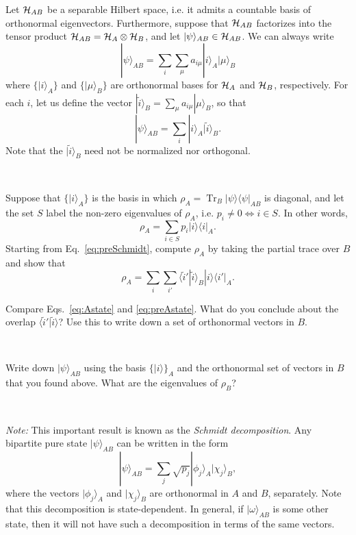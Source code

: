 \documentclass[a4paper,11pt]{article}
\DeclareMathOperator{\Tr}{Tr}
\newcommand{\ket}[1]{|#1\rangle}
\newcommand{\braket}[2]{\langle #1|#2\rangle}
\newcommand{\ketbra}[2]{| #1 \rangle \langle #2 |}
\newcommand{\Hil}{{\cal H}}
\begin{document}
\noindent Let $\Hil_{AB}$ be a separable Hilbert space, i.e. it admits a countable basis of orthonormal eigenvectors.
Furthermore, suppose that $\Hil_{AB}$ factorizes into the tensor product $\Hil_{AB} = \Hil_A \otimes \Hil_B$, and let $\ket{\psi}_{AB} \in \Hil_{AB}$.
We can always write
\begin{equation}
\ket{\psi}_{AB} = \sum_i \sum_\mu a_{i\mu} \ket{i}_A \ket{\mu}_B
\end{equation}
where $\{ \ket{i}_A \}$ and $\{ \ket{\mu}_B \}$ are orthonormal bases for $\Hil_A$ and $\Hil_B$, respectively.
For each $i$, let us define the vector $\ket{\tilde i}_B = \sum_{\mu} a_{i\mu} \ket{\mu}_B$, so that
\begin{equation} \label{eq:preSchmidt}
\ket{\psi}_{AB} = \sum_i \ket{i}_A \ket{\tilde i}_B.
\end{equation}
Note that the $\ket{\tilde i}_B$ need not be normalized nor orthogonal.

~

 Suppose that $\{ \ket{i}_A \}$ is the basis in which $\rho_A = \Tr_B \ketbra{\psi}{\psi}_{AB}$ is diagonal, and let the set $S$ label the non-zero eigenvalues of $\rho_A$, i.e. $p_i \neq 0 \Leftrightarrow i \in S$.
In other words,
\begin{equation} \label{eq:Astate}
\rho_A = \sum_{i \in S} p_i \ketbra{i}{i}_A .
\end{equation}
Starting from Eq.~\eqref{eq:preSchmidt}, compute $\rho_A$ by taking the partial trace over $B$ and show that
\begin{equation} \label{eq:preAstate}
\rho_A = \sum_i \sum_{i'} \braket{\tilde{i}'}{\tilde i}_B \ketbra{i}{i'}_A .
\end{equation}

 Compare Eqs.~\eqref{eq:Astate} and \eqref{eq:preAstate}.
What do you conclude about the overlap $\braket{\tilde{i}'}{\tilde i}$?
Use this to write down a set of orthonormal vectors in $B$.

~

 Write down $\ket{\psi}_{AB}$ using the basis $\{ \ket{i} \}_A$ and the orthonormal set of vectors in $B$ that you found above.
What are the eigenvalues of $\rho_B$?

~

\emph{Note:} This important result is known as the \emph{Schmidt decomposition}.
Any bipartite pure state $\ket{\psi}_{AB}$ can be written in the form
\begin{equation}
\ket{\psi}_{AB} = \sum_j \sqrt{p_j} \ket{\phi_j}_A \ket{\chi_j}_B,
\end{equation}
where the vectors $\ket{\phi_j}_A$ and $\ket{\chi_j}_B$ are orthonormal in $A$ and $B$, separately.
Note that this decomposition is state-dependent.
In general, if $\ket{\omega}_{AB}$ is some other state, then it will not have such a decomposition in terms of the same vectors.
\end{document}
